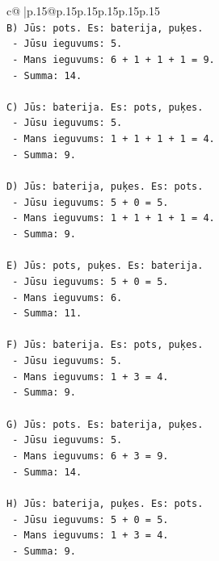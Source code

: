 \documentclass{article}
\begin{document}
{\begin{supertabular}{c@{$\;$}|p{.15\linewidth}@{}p{.15\linewidth}p{.15\linewidth}p{.15\linewidth}p{.15\linewidth}p{.15\linewidth}}
{{{\\ 
\texttt{B) Jūs: pots. Es: baterija, puķes.} \\
\texttt{   {-} Jūsu ieguvums: 5.} \\
\texttt{   {-} Mans ieguvums: 6 + 1 + 1 + 1 = 9.} \\
\texttt{   {-} Summa: 14.} \\
\\ 
\texttt{C) Jūs: baterija. Es: pots, puķes.} \\
\texttt{   {-} Jūsu ieguvums: 5.} \\
\texttt{   {-} Mans ieguvums: 1 + 1 + 1 + 1 = 4.} \\
\texttt{   {-} Summa: 9.} \\
\\ 
\texttt{D) Jūs: baterija, puķes. Es: pots.} \\
\texttt{   {-} Jūsu ieguvums: 5 + 0 = 5.} \\
\texttt{   {-} Mans ieguvums: 1 + 1 + 1 + 1 = 4.} \\
\texttt{   {-} Summa: 9.} \\
\\ 
\texttt{E) Jūs: pots, puķes. Es: baterija.} \\
\texttt{   {-} Jūsu ieguvums: 5 + 0 = 5.} \\
\texttt{   {-} Mans ieguvums: 6.} \\
\texttt{   {-} Summa: 11.} \\
\\ 
\texttt{F) Jūs: baterija. Es: pots, puķes.} \\
\texttt{   {-} Jūsu ieguvums: 5.} \\
\texttt{   {-} Mans ieguvums: 1 + 3 = 4.} \\
\texttt{   {-} Summa: 9.} \\
\\ 
\texttt{G) Jūs: pots. Es: baterija, puķes.} \\
\texttt{   {-} Jūsu ieguvums: 5.} \\
\texttt{   {-} Mans ieguvums: 6 + 3 = 9.} \\
\texttt{   {-} Summa: 14.} \\
\\ 
\texttt{H) Jūs: baterija, puķes. Es: pots.} \\
\texttt{   {-} Jūsu ieguvums: 5 + 0 = 5.} \\
\texttt{   {-} Mans ieguvums: 1 + 3 = 4.} \\
\texttt{   {-} Summa: 9.} \\
\\ 
}}}
\end{supertabular}}
\end{document}
